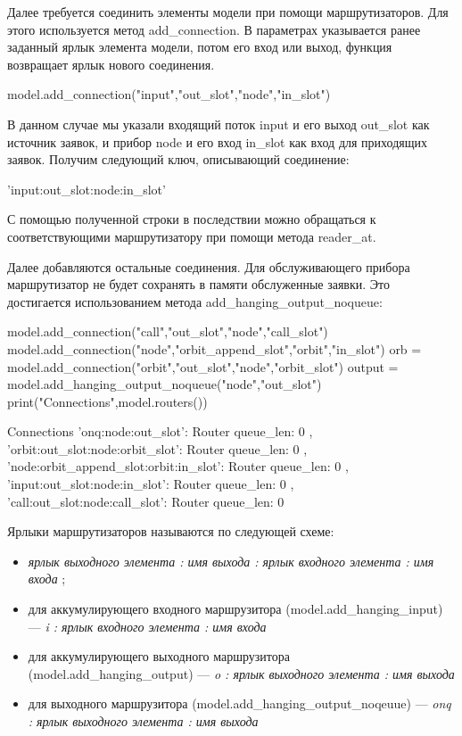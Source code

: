 Далее требуется соединить элементы модели при помощи маршрутизаторов. Для этого используется метод add\_connection. В параметрах указывается ранее заданный ярлык элемента модели, потом его вход или выход, функция возвращает ярлык нового соединения.

\begin{pyin}
	model.add_connection("input","out_slot","node","in_slot")
\end{pyin}
В данном случае мы указали входящий поток input и его выход out\_slot как источник заявок, и прибор node и его вход in\_slot как вход для приходящих заявок. Получим следующий ключ, описывающий соединение:
\begin{pyout}
'input:out_slot:node:in_slot'
\end{pyout}
С помощью полученной строки в последствии можно обращаться к соответствующими маршрутизатору при помощи метода reader\_at.

Далее добавляются остальные соединения. Для обслуживающего прибора маршрутизатор не будет сохранять в памяти обслуженные заявки. Это достигается использованием метода add\_hanging\_output\_noqueue:
\begin{pyin}
model.add_connection("call","out_slot","node","call_slot")
model.add_connection("node","orbit_append_slot","orbit","in_slot")
orb = model.add_connection("orbit","out_slot","node","orbit_slot")
output = model.add_hanging_output_noqueue("node","out_slot")
print("Connections",model.routers())
\end{pyin}

\begin{pyout}
Connections {
'onq:node:out_slot': Router{ queue_len: 0 },
'orbit:out_slot:node:orbit_slot': Router{ queue_len: 0 },
'node:orbit_append_slot:orbit:in_slot': Router{ queue_len: 0 },
'input:out_slot:node:in_slot': Router{ queue_len: 0 },
'call:out_slot:node:call_slot': Router{ queue_len: 0 }
}
\end{pyout}

Ярлыки маршрутизаторов называются по следующей схеме:
\begin{itemize}
	\item \textit{ ярлык выходного элемента :  имя выхода :  ярлык входного элемента : имя входа };
	\item для аккумулирующего входного маршрузитора (model.add\_hanging\_input) --- \textit{i :  ярлык входного элемента : имя входа}
	\item для аккумулирующего выходного маршрузитора (model.add\_hanging\_output) --- \textit{o :  ярлык выходного элемента : имя выхода}
	\item для выходного маршрузитора (model.add\_hanging\_output\_noqeuue) --- \textit{onq :  ярлык выходного элемента : имя выхода}
\end{itemize}

